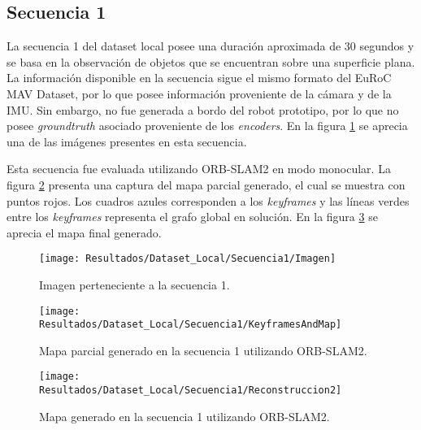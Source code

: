 \subsection{Secuencia 1}

La secuencia 1 del dataset local posee una duración aproximada de 30 segundos y se basa en la observación de objetos  que se encuentran sobre una superficie plana. La información disponible en la secuencia sigue el mismo formato del EuRoC MAV Dataset, por lo que posee información proveniente de la cámara y de la IMU. Sin embargo, no fue generada a bordo del robot prototipo, por lo que no posee \textit{groundtruth} asociado proveniente de los \textit{encoders}. En la figura \ref{imagen:Resultados/Dataset_Local/Secuencia1/Imagen} se aprecia una de las imágenes presentes en esta secuencia.

Esta secuencia fue evaluada utilizando ORB-SLAM2 en modo monocular. La figura \ref{imagen:Resultados/Dataset_Local/Secuencia1/KeyframesAndMap} presenta una captura del mapa parcial generado, el cual se muestra con puntos rojos. Los cuadros azules corresponden a los \textit{keyframes} y las líneas verdes entre los \textit{keyframes} representa el grafo global en solución. En la figura \ref{imagen:Resultados/Dataset_Local/Secuencia1/Reconstruccion2} se aprecia el mapa final generado.

 
\begin{figure}[H]
	\centering
	\texttt{[image: Resultados/Dataset\_Local/Secuencia1/Imagen]}
	\caption[Imagen perteneciente a la secuencia 1 del dataset local]{Imagen perteneciente a la secuencia 1.}
	\label{imagen:Resultados/Dataset_Local/Secuencia1/Imagen}
\end{figure}


\begin{figure}[H]
	\centering
	\texttt{[image: Resultados/Dataset\_Local/Secuencia1/KeyframesAndMap]}
	\caption[Mapa parcial generado en la secuencia 1 utilizando ORB-SLAM2]{Mapa parcial generado en la secuencia 1 utilizando ORB-SLAM2.}
	\label{imagen:Resultados/Dataset_Local/Secuencia1/KeyframesAndMap}
\end{figure}

\begin{figure}[H]
	\centering
	\texttt{[image: Resultados/Dataset\_Local/Secuencia1/Reconstruccion2]}
	\caption[Mapa generado en la secuencia 1 utilizando ORB-SLAM2]{Mapa generado en la secuencia 1 utilizando ORB-SLAM2.}
	\label{imagen:Resultados/Dataset_Local/Secuencia1/Reconstruccion2}
\end{figure}


